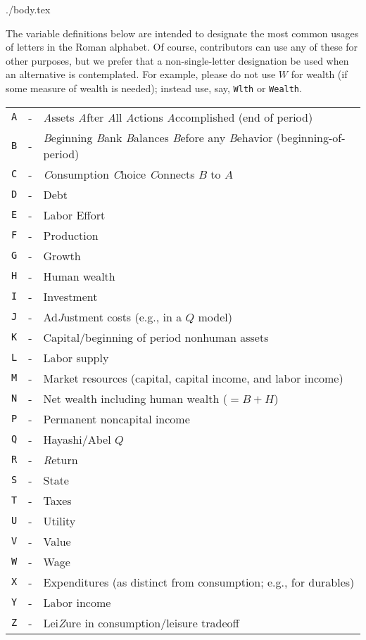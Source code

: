 \documentclass{econtex}
\begin{document}
\begin{verbatimwrite}{./body.tex}

The variable definitions below are intended to designate the most common usages of letters in the Roman alphabet.  Of course, contributors can use any of these for other purposes, but we prefer that a non-single-letter designation be used when an alternative is contemplated.  For example, please do not use $W$ for wealth (if some measure of wealth is needed); instead use, say, \texttt{Wlth} or \texttt{Wealth}. 

\begin{table}[h]
\begin{tabular}{rcl}
    \texttt{A} & - & {\it A}ssets {\it A}fter {\it A}ll {\it A}ctions {\it A}ccomplished (end of period)
\\  \texttt{B} & - & {\it B}eginning {\it B}ank {\it B}alances {\it B}efore any {\it B}ehavior (beginning-of-period)
\\  \texttt{C} & - & {\it C}onsumption {\it C}hoice {\it C}onnects $B$ to $A$
\\  \texttt{D} & - & Debt
\\  \texttt{E} & - & Labor Effort
\\  \texttt{F} & - & Production
\\  \texttt{G} & - & Growth 
\\  \texttt{H} & - & Human wealth
\\  \texttt{I} & - & Investment
\\  \texttt{J} & - & Ad{\it J}ustment costs (e.g., in a $Q$ model)
\\  \texttt{K} & - & Capital/beginning of period nonhuman assets
\\  \texttt{L} & - & Labor supply
\\  \texttt{M} & - & Market resources (capital, capital income, and labor income)
\\  \texttt{N} & - & Net wealth including human wealth ($=B + H$)
\\  \texttt{P} & - & Permanent noncapital income
\\  \texttt{Q} & - & Hayashi/Abel $Q$
\\  \texttt{R} & - & {\it R}eturn
\\  \texttt{S} & - & State
\\  \texttt{T} & - & Taxes
\\  \texttt{U} & - & Utility
\\  \texttt{V} & - & Value
\\  \texttt{W} & - & Wage
\\  \texttt{X} & - & Expenditures (as distinct from consumption; e.g., for durables)
\\  \texttt{Y} & - & Labor income
\\  \texttt{Z} & - & Lei{\it Z}ure in consumption/leisure tradeoff
\end{tabular}
\end{table}

\end{verbatimwrite}

\end{document}
